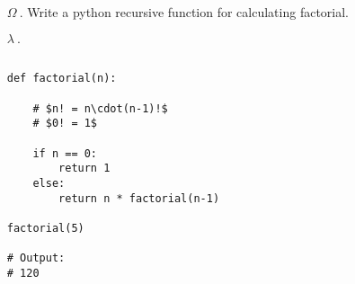 \documentclass{article}
\begin{document}
\pagecolor{BLUE20}
\ttfamily
\sloppy
\vspace*{\fill}
\begin{itemize}
	\item[\textcolor{GREEN10}{$\Omega ~.$}]\textcolor{GREEN10}{Write a python recursive function for calculating factorial.}

	\item[\textcolor{WHITE01}{$\lambda ~.$}]
\begin{verbatim}

def factorial(n):
	
	# $n! = n\cdot(n-1)!$
	# $0! = 1$

    if n == 0:
        return 1
    else:
        return n * factorial(n-1)
      
factorial(5) 
 
# Output:
# 120
\end{verbatim}
\end{itemize}
\vspace*{\fill}
\end{document}
